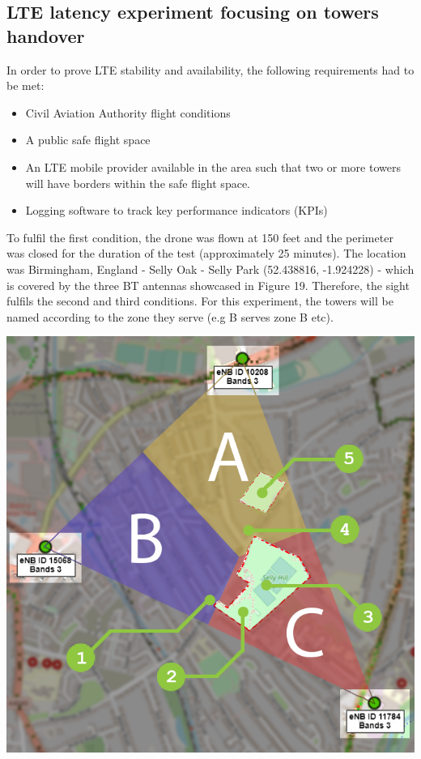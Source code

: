 \documentclass{IEEEtran}
\begin{document}
\subsection{LTE latency experiment focusing on towers handover}
In order to prove LTE stability and availability, the following requirements had to be met:
\begin{itemize}
    \item Civil Aviation Authority flight conditions
    \item A public safe flight space
    \item An LTE mobile provider available in the area such that two or more towers will have borders within the safe flight space.
    \item Logging software to track key performance indicators (KPIs)
\end{itemize}
To fulfil the first condition, the drone was flown at 150 feet and the perimeter was closed for the duration of the test (approximately 25 minutes). The location was Birmingham, England - Selly Oak - Selly Park (52.438816, -1.924228) - which is covered by the three BT antennas showcased in Figure 19. Therefore, the sight fulfils the second and third conditions.
For this experiment, the towers will be named according to the zone they serve (e.g B serves zone B etc).
\begin{center}\includegraphics[scale=.60]{routersmap.png}\end{center}
\end{document}
